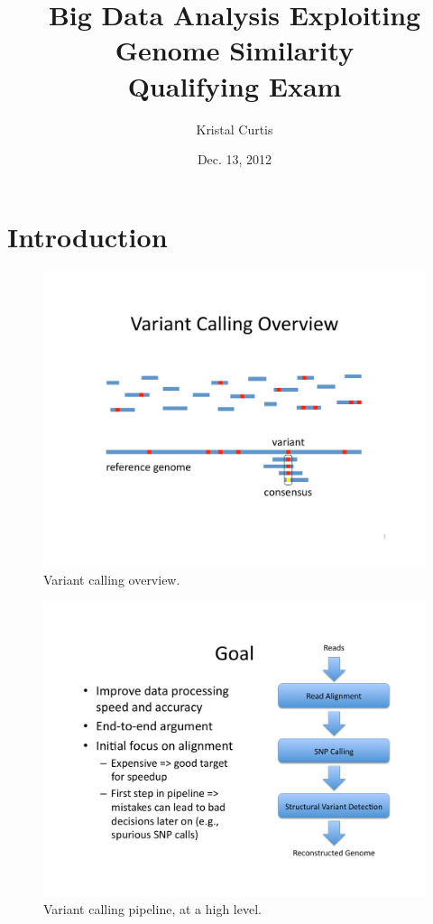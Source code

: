 \documentclass[twocolumn,10pt]{article}
\begin{document}
\title{Big Data Analysis Exploiting Genome Similarity\\ Qualifying Exam}
\author{Kristal Curtis}
\date{Dec. 13, 2012}
\maketitle

\abstract

\section{Introduction} 

\begin{figure}
\centering
\includegraphics[scale=0.6]{variantCalling.pdf}
\caption{Variant calling overview.}
\label{fig:variantCalling}
\end{figure}

\begin{figure}
\centering
\includegraphics[scale=0.6]{pipeline.pdf}
\caption{Variant calling pipeline, at a high level.}
\label{fig:pipeline}
\end{figure}
\end{document}
